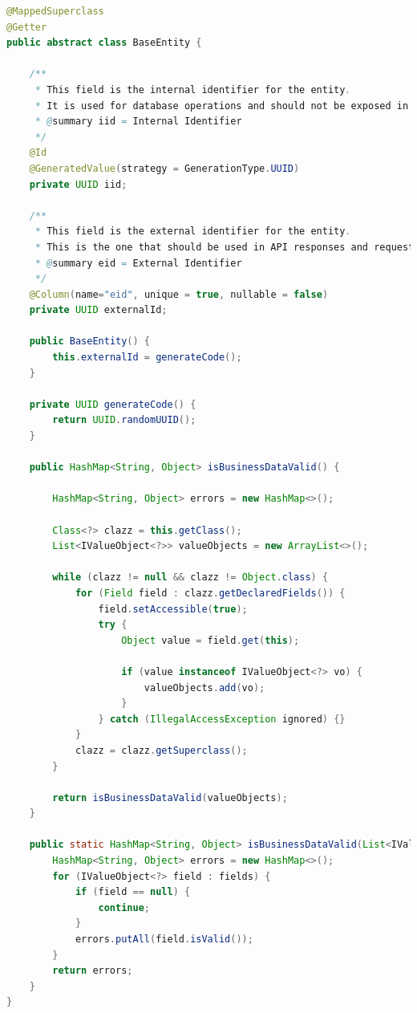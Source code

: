 \begin{lstlisting}[language=Java,caption={Classe \textit{BaseEntity}},label={lst:base-entity}]
@MappedSuperclass
@Getter
public abstract class BaseEntity {

    /**
     * This field is the internal identifier for the entity.
     * It is used for database operations and should not be exposed in API responses.
     * @summary iid = Internal Identifier
     */
    @Id
    @GeneratedValue(strategy = GenerationType.UUID)
    private UUID iid;

    /**
     * This field is the external identifier for the entity.
     * This is the one that should be used in API responses and requests.
     * @summary eid = External Identifier
     */
    @Column(name="eid", unique = true, nullable = false)
    private UUID externalId;

    public BaseEntity() {
        this.externalId = generateCode();
    }

    private UUID generateCode() {
        return UUID.randomUUID();
    }

    public HashMap<String, Object> isBusinessDataValid() {

        HashMap<String, Object> errors = new HashMap<>();

        Class<?> clazz = this.getClass();
        List<IValueObject<?>> valueObjects = new ArrayList<>();

        while (clazz != null && clazz != Object.class) {
            for (Field field : clazz.getDeclaredFields()) {
                field.setAccessible(true);
                try {
                    Object value = field.get(this);

                    if (value instanceof IValueObject<?> vo) {
                        valueObjects.add(vo);
                    }
                } catch (IllegalAccessException ignored) {}
            }
            clazz = clazz.getSuperclass();
        }

        return isBusinessDataValid(valueObjects);
    }

    public static HashMap<String, Object> isBusinessDataValid(List<IValueObject<?>> fields) {
        HashMap<String, Object> errors = new HashMap<>();
        for (IValueObject<?> field : fields) {
            if (field == null) {
                continue;
            }
            errors.putAll(field.isValid());
        }
        return errors;
    }
}

\end{lstlisting}




